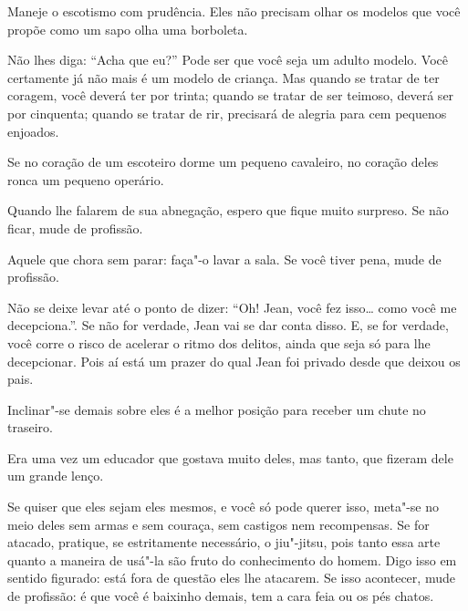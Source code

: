 \pagebreak

Maneje o escotismo com prudência. Eles não precisam olhar os modelos que
você propõe como um sapo olha uma borboleta.

\bigskip
\bigskip

Não lhes diga: ``Acha que eu?'' Pode ser que você seja um adulto modelo.
Você certamente já não mais é um modelo de criança. Mas quando se tratar
de ter coragem, você deverá ter por trinta; quando se tratar de ser
teimoso, deverá ser por cinquenta; quando se tratar de rir, precisará de
alegria para cem pequenos enjoados.

\bigskip
\bigskip

Se no coração de um escoteiro dorme um pequeno cavaleiro, no coração
deles ronca um pequeno operário.

\bigskip
\bigskip

Quando lhe falarem de sua abnegação, espero que fique muito surpreso. Se
não ficar, mude de profissão.

\bigskip
\bigskip

Aquele que chora sem parar: faça"-o lavar a sala. Se você tiver pena,
mude de profissão.

\bigskip
\bigskip

Não se deixe levar até o ponto de dizer: ``Oh! Jean, você fez isso\ldots{}
como você me decepciona.''. Se não for verdade, Jean vai se dar conta
disso. E, se for verdade, você corre o risco de acelerar o ritmo dos
delitos, ainda que seja só para lhe decepcionar. Pois aí está um prazer
do qual Jean foi privado desde que deixou os pais.

\bigskip
\bigskip

Inclinar"-se demais sobre eles é a melhor posição para receber um chute
no traseiro.

\bigskip
\bigskip

Era uma vez um educador que gostava muito deles, mas tanto, que fizeram
dele um grande lenço.

\bigskip
\bigskip

Se quiser que eles sejam eles mesmos, e você só pode querer isso,
meta"-se no meio deles sem armas e sem couraça, sem castigos nem
recompensas. Se for atacado, pratique, se estritamente necessário, o
jiu"-jitsu, pois tanto essa arte quanto a maneira de usá"-la são fruto do
conhecimento do homem. Digo isso em sentido figurado: está fora de
questão eles lhe atacarem. Se isso acontecer, mude de profissão: é que
você é baixinho demais, tem a cara feia ou os pés chatos.


